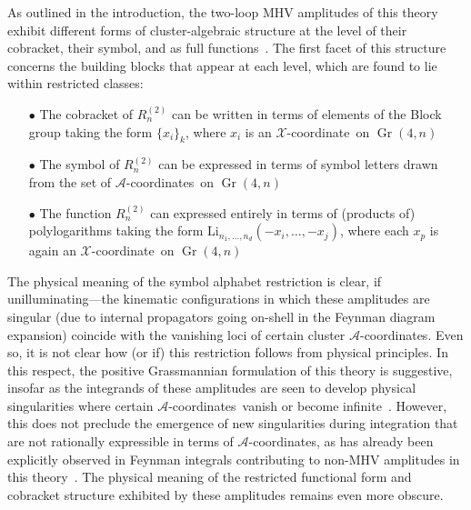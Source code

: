 \documentclass[12pt]{article}
\DeclareMathOperator{\Gr}{Gr}
\def\xcoord{$\mathcal{X}$-coordinate}
\def\acoords{$\mathcal{A}$-coordinates}
\begin{document}
As outlined in the introduction, the two-loop MHV amplitudes of this theory exhibit different forms of cluster-algebraic structure at the level of their cobracket, their symbol, and as full functions~\cite{Golden:2013xva,Golden:2014xqa,Golden:2014xqf,Golden:2014pua}. The first facet of this structure concerns the building blocks that appear at each level, which are found to lie within restricted classes:
\begin{itemize}
\item[$\bullet$] The cobracket of $R^{(2)}_n$ can be written in terms of elements of the Block group taking the form $\{x_i \}_k$, where $x_i$ is an \xcoord\ on $\Gr(4,n)$
\item[$\bullet$] The symbol of $R^{(2)}_n$ can be expressed in terms of symbol letters drawn from the set of \acoords\ on $\Gr(4,n)$
\item[$\bullet$] The function $R^{(2)}_n$ can expressed entirely in terms of (products of) polylogarithms taking the form $\text{Li}_{n_1,\dots,n_d}(-x_i,\dots,-x_j)$, where each $x_p$ is again an \xcoord\ on $\Gr(4,n)$
\end{itemize}
The physical meaning of the symbol alphabet restriction is clear, if unilluminating---the kinematic configurations in which these amplitudes are singular (due to internal propagators going on-shell in the Feynman diagram expansion) coincide with the vanishing loci of certain cluster \acoords. Even so, it is not clear how (or if) this restriction follows from physical principles. In this respect, the positive Grassmannian formulation of this theory is suggestive, insofar as the integrands of these amplitudes are seen to develop physical singularities where certain \acoords\ vanish or become infinite~\cite{ArkaniHamed:2012nw}. However, this does not preclude the emergence of new singularities during integration that are not rationally expressible in terms of \acoords, as has already been explicitly observed in Feynman integrals contributing to non-MHV amplitudes in this theory~\cite{Bourjaily:2018aeq,Henn:2018cdp,Prlina:2017azl}. The physical meaning of the restricted functional form and cobracket structure exhibited by these amplitudes remains even more obscure. 
\end{document}

